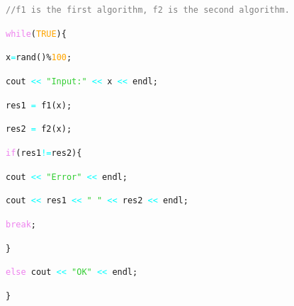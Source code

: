 \documentclass{article}
\theoremstyle{definition}
\theoremstyle{example}
\begin{document}
\noindent \hspace{2mm} \texttt{\textcolor{gray}{//f1 is the first algorithm, f2 is the second algorithm.}}\par
\noindent \hspace{2mm} 
\texttt{\textcolor{violet}{while}(\textcolor{orange}{TRUE})\{ }\par
\noindent \hspace{12mm}
\texttt{x\textcolor{cyan}{=}\textcolor{NavyBlue}{rand}()\%\textcolor{orange}{100};}\par
\noindent \hspace{12mm}
\texttt{cout \textcolor{cyan}{<<} \textcolor{LimeGreen}{"Input:"} \textcolor{cyan}{<<} x \textcolor{cyan}{<<} endl;}\par
\noindent \hspace{12mm}
\texttt{res1 \textcolor{cyan}{=} f1(x);}\par
\noindent \hspace{12mm} \texttt{res2 \textcolor{cyan}{=} f2(x);} \par
\noindent \hspace{12mm} \texttt{\textcolor{violet}{if}(res1\textcolor{cyan}{!=}res2)\{} \par
\noindent \hspace{22mm} \texttt{cout \textcolor{cyan}{<<} \textcolor{LimeGreen}{"Error"} \textcolor{cyan}{<<} endl;}\par
\noindent \hspace{22mm} \texttt{cout \textcolor{cyan}{<<} res1 \textcolor{cyan}{<<} \textcolor{LimeGreen}{" "} \textcolor{cyan}{<<} res2 \textcolor{cyan}{<<} endl;} \par
\noindent \hspace{22mm} \texttt{\textcolor{violet}{break};} \par
\noindent \hspace{12mm} \texttt{\}}\par
\noindent \hspace{12mm} \texttt{\textcolor{violet}{else} cout \textcolor{cyan}{<<} \textcolor{LimeGreen}{"OK"} \textcolor{cyan}{<<} endl;}\par
\noindent \hspace{2mm}\texttt{\}}
\end{document}
